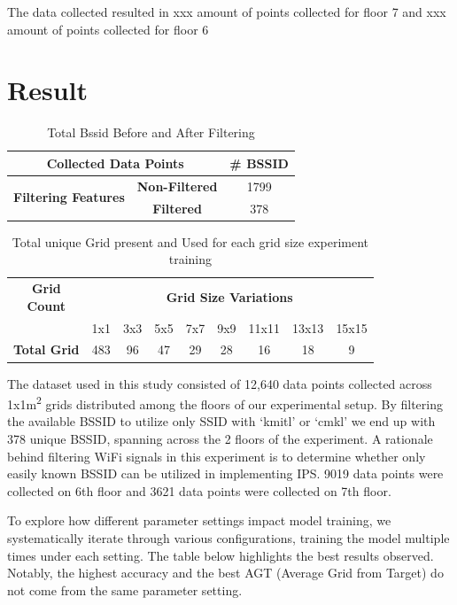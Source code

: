 \documentclass[conference]{IEEEtran}
\begin{document}
	
	The data collected resulted in xxx amount of points collected for floor 7 and xxx amount of points collected for floor 6
	
	
	
	\section{Result}
	\begin{table}[htbp]
		\centering
		\begin{tabular}{|c|c|c|}
			\hline
			\multicolumn{2}{|c|}{\textbf{Collected Data Points}} & \textbf{\# BSSID} \\
			\hline
			\multirow{2}{*}{\textbf{Filtering Features}} & \textbf{Non-Filtered} & 1799 \\
			\cline{2-3}
			& \textbf{Filtered}     & 378  \\
			\hline
		\end{tabular}
		\caption{Total Bssid Before and After Filtering}
		\label{tab:bssid_counts}
	\end{table}
	
	\begin{table}[htbp]
		\centering
		\begin{tabular}{|c|c|c|c|c|c|c|c|c|}
			\hline
			\makecell{\textbf{Grid}\\\textbf{Count}} & \multicolumn{8}{c|}{\textbf{Grid Size Variations}} \\
			\cline{2-9}
			& 1x1 & 3x3 & 5x5 & 7x7 & 9x9 & 11x11 & 13x13 & 15x15 \\
			\hline
			\textbf{Total Grid} & 483 & 96 & 47 & 29 & 28 & 16 & 18 & 9 \\
			\hline
		\end{tabular}
		\caption{Total unique Grid present and Used for each grid size experiment training}
		\label{tab:grid_size_variations}
	\end{table}
	
	The dataset used in this study consisted of 12,640 data points collected across 1x1m\textsuperscript{2} grids distributed among the floors of our experimental setup. By filtering the available BSSID to utilize only SSID with ‘kmitl’ or ‘cmkl’ we end up with 378 unique BSSID, spanning across the 2 floors of the experiment. A rationale behind filtering WiFi signals in this experiment is to determine whether only easily known BSSID can be utilized in implementing IPS. 9019 data points were collected on 6th floor and 3621 data points were collected on 7th floor.
	
	To explore how different parameter settings impact model training, we systematically iterate through various configurations, training the model multiple times under each setting. The table below highlights the best results observed. Notably, the highest accuracy and the best AGT (Average Grid from Target) do not come from the same parameter setting.
	
\end{document}
